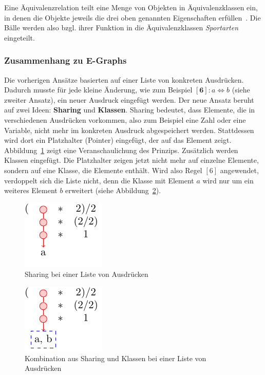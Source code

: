 Eine Äquivalenzrelation teilt eine Menge von Objekten in Äquivalenzklassen ein, in denen die Objekte jeweils die drei oben genannten Eigenschaften erfüllen~\cite{Ehrig2001}.
Die Bälle werden also bzgl. ihrer Funktion in die Äquivalenzklassen \textit{Sportarten} eingeteilt.

\subsubsection{Zusammenhang zu E-Graphs}

Die vorherigen Ansätze basierten auf einer Liste von konkreten Ausdrücken. Dadurch musste für jede kleine Änderung, wie zum Beispiel $[\mathbf{6}]: a \Leftrightarrow b$ (siehe zweiter Ansatz),
ein neuer Ausdruck eingefügt werden. Der neue Ansatz beruht auf zwei Ideen: \textbf{Sharing} und \textbf{Klassen}.
Sharing bedeutet, dass Elemente, die in verschiedenen Ausdrücken vorkommen, also zum Beispiel eine Zahl oder eine Variable, nicht mehr im konkreten Ausdruck abgespeichert werden.
Stattdessen wird dort ein Platzhalter (Pointer) eingefügt, der auf das Element zeigt. Abbildung~\ref{fig:sharing} zeigt eine Veranschaulichung des Prinzips.
Zusätzlich werden Klassen eingefügt. Die Platzhalter zeigen jetzt nicht mehr auf einzelne Elemente, sondern auf eine Klasse, die Elemente enthält. Wird also Regel $[6]$ angewendet,
verdoppelt sich die Liste nicht, denn die Klasse mit Element $a$ wird nur um ein weiteres Element $b$ erweitert (siehe Abbildung~\ref{fig:classes}). 

{
\begin{minipage}[c]{0.5\linewidth}
    \begin{figure}[H]
        \centering
        \includegraphics[scale=1.6]{../fig/sharing.pdf}
        \caption{Sharing bei einer Liste von Ausdrücken}
        \label{fig:sharing}
    \end{figure}
    \end{minipage}
    \begin{minipage}[c]{0.5\linewidth}
    \begin{figure}[H]
        \centering
        \includegraphics[scale=1.6]{../fig/classes.pdf}
        \caption{Kombination aus Sharing und Klassen bei einer Liste von Ausdrücken}
        \label{fig:classes}
    \end{figure}
\end{minipage}}


